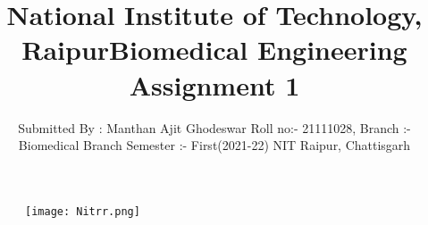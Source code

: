 \documentclass[12pt]{article}
\title{National Institute of Technology, Raipur}
\begin{document}
 
\maketitle
\begin{figure}[h]
\centering
\texttt{[image: Nitrr.png]}
\end{figure}
\bigskip
\bigskip
\centering
\begin{Large}
\title{Biomedical Engineering Assignment 1}
\end{Large}

\bigskip
\bigskip
\bigskip
\bigskip

\raggedright 
\author{Submitted By : Manthan Ajit Ghodeswar
\linebreak Roll no:- 21111028,
\linebreak Branch :- Biomedical Branch
\linebreak Semester :- First(2021-22)
\linebreak NIT Raipur, Chattisgarh}



\clearpage

\centering
\tableofcontents
\clearpage
\end{document}
